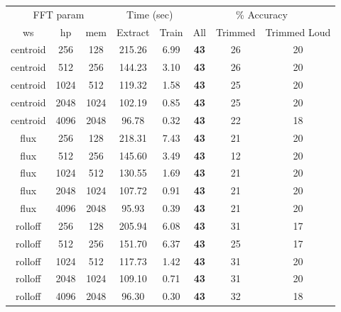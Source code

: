 \begin{table}
\begin{tabular}{|c|c|c|c|c|c|c|c|}
\hline
\multicolumn{3}{|c|}{FFT param} & \multicolumn{2}{c|}{Time (sec)} & \multicolumn{3}{c|}{\% Accuracy} \\
\hhline{|-|-|-|-|-|-|-|-|}
ws & hp & mem & Extract & Train & All & Trimmed & Trimmed Loud \\
\hhline{|=|=|=|=|=|=|=|=|}
centroid & 256 & 128       &   215.26  &    6.99  &  \textbf{43}  & 26 & 20 \\
centroid & 512 & 256       &   144.23  &    3.10  &  \textbf{43}  & 26 & 20 \\
centroid & 1024 & 512      &   119.32  &    1.58  &  \textbf{43}  & 25 & 20 \\
centroid & 2048 & 1024     &   102.19  &    0.85  &  \textbf{43}  & 25 & 20 \\
centroid & 4096 & 2048     &    96.78  &    0.32  &  \textbf{43}  & 22 & 18 \\
\hline
flux & 256 & 128           &   218.31  &    7.43  &  \textbf{43}  & 21 & 20 \\
flux & 512 & 256           &   145.60  &    3.49  &  \textbf{43}  & 12 & 20 \\
flux & 1024 & 512          &   130.55  &    1.69  &  \textbf{43}  & 21 & 20 \\
flux & 2048 & 1024         &   107.72  &    0.91  &  \textbf{43}  & 21 & 20 \\
flux & 4096 & 2048         &    95.93  &    0.39  &  \textbf{43}  & 21 & 20 \\
\hline
rolloff & 256 & 128        &   205.94  &    6.08  &  \textbf{43}  & 31 & 17 \\
rolloff & 512 & 256        &   151.70  &    6.37  &  \textbf{43}  & 25 & 17 \\
rolloff & 1024 & 512       &   117.73  &    1.42  &  \textbf{43}  & 31 & 20 \\
rolloff & 2048 & 1024      &   109.10  &    0.71  &  \textbf{43}  & 31 & 20 \\
rolloff & 4096 & 2048      &    96.30  &    0.30  &  \textbf{43}  & 32 & 18 \\

\end{tabular}
\end{table}
